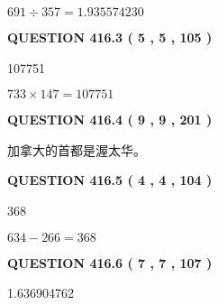 \documentclass{ctexart}
\begin{document}
$ %
691 \div  %
357=   %
1.935574230$
 
 
  
\vspace{0.2in}
  
{\textbf{\Large{QUESTION
416.3 
 ( 5 , 5 , 105 )
}}}
  
  
 
 
\noindent{}

107751
 
 
 
 
\noindent{}

$ %
733 \times  %
147=   %
107751$
 
 
  
\vspace{0.2in}
  
{\textbf{\Large{QUESTION
416.4 
 ( 9 , 9 , 201 )
}}}
  
  
 
 
\noindent{}
 
 
加拿大的首都是渥太华。
 
 
 
 
  
\vspace{0.2in}
  
{\textbf{\Large{QUESTION
416.5 
 ( 4 , 4 , 104 )
}}}
  
  
 
 
\noindent{}

368
 
 
 
 
\noindent{}

$ %
634 -  %
266=   %
368$
 
 
  
\vspace{0.2in}
  
{\textbf{\Large{QUESTION
416.6 
 ( 7 , 7 , 107 )
}}}
  
  
 
 
\noindent{}

1.636904762
 
 
 
\end{document}
